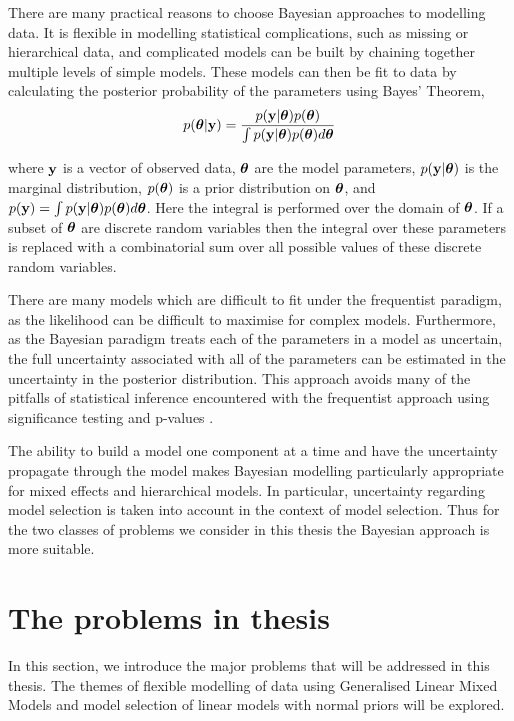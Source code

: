 There are many practical reasons to choose Bayesian approaches to modelling
data. It is flexible in modelling statistical complications, such as missing or
hierarchical data, and complicated models can be built by chaining together
multiple levels of simple models. These models can then be fit to data by
calculating the posterior probability of the parameters using Bayes' Theorem,
\[
	p({\boldsymbol \theta} | {\bf y}) = \frac{p({\bf y} | {\boldsymbol \theta}) p({\boldsymbol \theta})}{\int p({\bf y} | {\boldsymbol \theta}) p({\boldsymbol \theta}) d {\boldsymbol \theta}}
\]

\noindent where ${\bf y}$ is a vector of observed data, ${\boldsymbol \theta}$ are the model
parameters, $p({\bf y}|{\boldsymbol \theta})$ is the marginal distribution, $p({\boldsymbol \theta})$ is a
prior distribution on ${\boldsymbol \theta}$, and $p({\bf y})=\int
p({\bf y}|{\boldsymbol \theta})p({\boldsymbol \theta})d{\boldsymbol \theta}$.  Here the integral is performed over the
domain of ${\boldsymbol \theta}$. If a subset of ${\boldsymbol \theta}$ are discrete random variables
then the integral over these parameters is replaced with a combinatorial sum
over all possible values of these discrete random variables.

There are many models which are difficult to fit under the frequentist paradigm,
as the likelihood can be difficult to maximise for complex models. Furthermore,
as the Bayesian paradigm treats each of the parameters in a model as uncertain,
the full uncertainty associated with all of the parameters can be estimated in
the uncertainty in the posterior distribution. This approach avoids many of the
pitfalls of statistical inference encountered with the frequentist approach
using significance testing and p-values \citep{Cox2005}.

The ability to build a model one component at a time and have the uncertainty
propagate through the model makes Bayesian modelling  particularly appropriate
for mixed effects and hierarchical models. In particular, uncertainty regarding
model selection is taken into account in the context of model selection. Thus
for the two classes of problems we consider in this thesis the Bayesian approach
is more suitable.

\section{The problems in thesis}

In this section, we introduce the major problems that will be addressed in this
thesis. The themes of flexible modelling of data using Generalised Linear Mixed
Models and model selection of linear models with normal priors  will be
explored.

